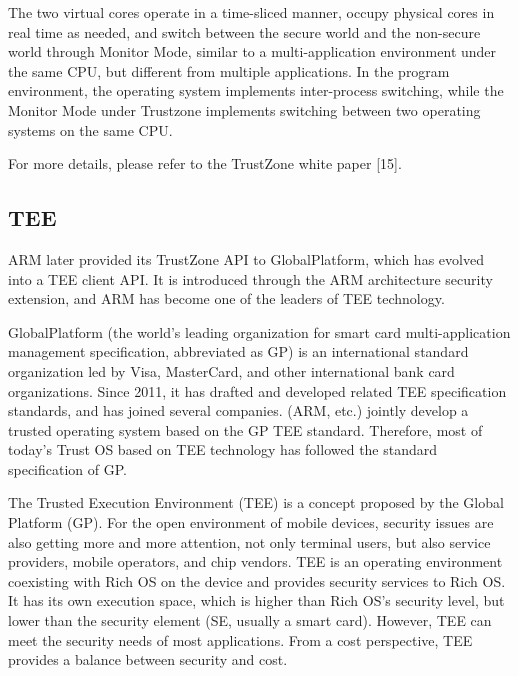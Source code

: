 \documentclass[journal]{IEEEtran}
\begin{document}
The two virtual cores operate in a time-sliced manner, occupy physical cores in real time as needed, and switch between the secure world and the non-secure world through Monitor Mode, similar to a multi-application environment under the same CPU, but different from multiple applications. In the program environment, the operating system implements inter-process switching, while the Monitor Mode under Trustzone implements switching between two operating systems on the same CPU.

For more details, please refer to the TrustZone white paper [15].

\subsection{TEE}

ARM later provided its TrustZone API to GlobalPlatform, which has evolved into a TEE client API. It is introduced through the ARM architecture security extension, and ARM has become one of the leaders of TEE technology.


GlobalPlatform (the world's leading organization for smart card multi-application management specification, abbreviated as GP) is an international standard organization led by Visa, MasterCard, and other international bank card organizations. Since 2011, it has drafted and developed related TEE specification standards, and has joined several companies. (ARM, etc.) jointly develop a trusted operating system based on the GP TEE standard. Therefore, most of today's Trust OS based on TEE technology has followed the standard specification of GP.



The Trusted Execution Environment (TEE) is a concept proposed by the Global Platform (GP). For the open environment of mobile devices, security issues are also getting more and more attention, not only terminal users, but also service providers, mobile operators, and chip vendors. TEE is an operating environment coexisting with Rich OS  on the device and provides security services to Rich OS. It has its own execution space, which is higher than Rich OS's security level, but lower than the security element (SE, usually a smart card). However, TEE can meet the security needs of most applications. From a cost perspective, TEE provides a balance between security and cost.
 
\end{document}
